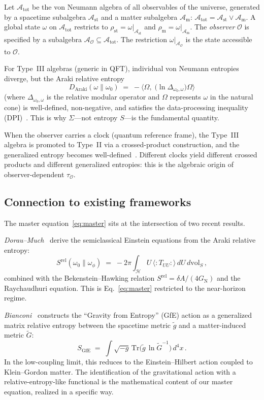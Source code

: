 \documentclass[prd,twocolumn,superscriptaddress,longbibliography,floatfix]{revtex4-2}
\newcommand{\Tr}{\mathrm{Tr}}
\newcommand{\tauasym}{\tau}
\newcommand{\Daraki}{D_{\mathrm{Araki}}}
\newcommand{\Aobs}{\mathcal{A}_{\mathcal{O}}}
\newcommand{\Atot}{\mathcal{A}_{\mathrm{tot}}}
\newcommand{\Ast}{\mathcal{A}_{\mathrm{st}}}
\newcommand{\Am}{\mathcal{A}_{\mathrm{m}}}
\newcommand{\rhost}{\rho_{\mathrm{st}}}
\newcommand{\rhom}{\rho_{\mathrm{m}}}
\newcommand{\tauO}{\tauasym_{\mathcal{O}}}
\newcommand{\GN}{G_{\mathrm{N}}}
\begin{document}
Let $\Atot$ be the von Neumann algebra of all observables
of the universe, generated by a spacetime subalgebra
$\Ast$ and a matter subalgebra $\Am$:
$\Atot = \Ast \vee \Am$.
A global state $\omega$ on $\Atot$ restricts to
$\rhost = \omega|_{\Ast}$ and $\rhom = \omega|_{\Am}$.
The \emph{observer} $\mathcal{O}$ is specified by a
subalgebra $\Aobs \subseteq \Atot$.  The restriction
$\omega|_{\Aobs}$ is the state accessible to
$\mathcal{O}$.

For Type~III algebras (generic in QFT), individual von
Neumann entropies diverge, but the Araki relative entropy
\begin{equation}
\Daraki(\omega\|\omega_0) \;=\;
-\bigl\langle\Omega,\;
\bigl(\ln\Delta_{\omega_0,\omega}\bigr)\Omega
\bigr\rangle
\label{eq:araki}
\end{equation}
(where $\Delta_{\omega_0,\omega}$ is the relative modular
operator and $\Omega$ represents $\omega$ in the natural
cone) is well-defined, non-negative, and satisfies the
data-processing inequality (DPI)~\cite{Araki1976,Lindblad1975}.
This is why $\Sigma$---not entropy $S$---is the
fundamental quantity.

When the observer carries a clock (quantum reference
frame), the Type~III algebra is promoted to Type~II via
a crossed-product construction, and the generalized
entropy becomes well-defined~\cite{Chandrasekaran2023,
DeVuyst2025}.  Different clocks yield different
crossed products and different generalized entropies:
this is the algebraic origin of observer-dependent
$\tauO$.

\subsection{Connection to existing frameworks}

The master equation~\eqref{eq:master} sits at the
intersection of two recent results.

\emph{Dorau--Much}~\cite{DorauMuch2025} derive the
semiclassical Einstein equations from the Araki relative
entropy:
\begin{equation}
S^{\mathrm{rel}}(\omega_0\|\omega_\phi) \;=\;
-2\pi\!\int_{\mathcal{H}}\!
U\,\langle{:}T_{UU}{:}\rangle\,dU\,d\mathrm{vol}_S\,,
\label{eq:dorau_much}
\end{equation}
combined with the Bekenstein--Hawking relation
$S^{\mathrm{rel}} = \delta A/(4\GN)$
and the Raychaudhuri equation.  This is
Eq.~\eqref{eq:master} restricted to the near-horizon
regime.

\emph{Bianconi}~\cite{Bianconi2025} constructs the
``Gravity from Entropy'' (GfE) action as a generalized
matrix relative entropy between the spacetime metric
$\tilde{g}$ and a matter-induced metric $\tilde{G}$:
\begin{equation}
S_{\mathrm{GfE}} \;=\;
\int\!\sqrt{-g}\,
\Tr\bigl(\tilde{g}\,\ln\tilde{G}^{-1}\bigr)\,d^4x\,.
\label{eq:bianconi}
\end{equation}
In the low-coupling limit, this reduces to the
Einstein--Hilbert action coupled to Klein--Gordon
matter.  The identification of the gravitational action
with a relative-entropy-like functional is the
mathematical content of our master equation, realized
in a specific way.
\end{document}
